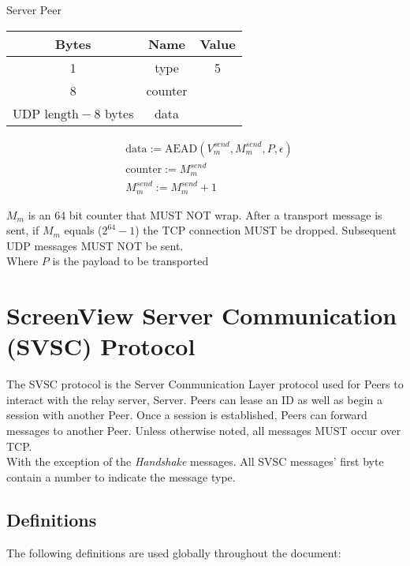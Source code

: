 \documentclass{article}
\begin{document}
    \begin{center}
        Server \textrightarrow Peer\\
        \begin{tabular}{|c|c|c|}
            \hline
            \textbf{Bytes}                & \textbf{Name} & \textbf{Value} \\
            \hline
            1                             & type          & 5              \\
            \hline
            8                             & counter       &                \\
            \hline
            $\text{UDP length} - 8$ bytes & data          &                \\
            \hline
        \end{tabular}
    \end{center}


    \begin{align*}
        & \text{data} := \text{AEAD}(V_{m}^{send}, M_{m}^{send}, P, \epsilon)\\
        & \text{counter} := M_{m}^{send}\\
        & M_{m}^{send} := M_{m}^{send} + 1
    \end{align*}


    $M_{m}$ is an 64 bit counter that MUST NOT wrap. After a transport message is sent, if $M_{m}$ equals
    ($2^{64}-1$) the TCP connection MUST be dropped. Subsequent UDP messages MUST NOT be sent. \\

    Where $P$ is the payload to be transported


    \section{ScreenView Server Communication (SVSC) Protocol }

    The SVSC protocol is the Server Communication Layer protocol used for Peers to interact with the relay server,
    Server. Peers can lease an ID as well as begin a session with another Peer. Once a session is established, Peers can
    forward messages to another Peer. Unless otherwise noted, all messages MUST occur over TCP.\\

    With the exception of the \emph{Handshake} messages. All SVSC messages' first byte contain a number to indicate
    the message type.

    \subsection{Definitions}
    The following definitions are used globally throughout the document:
\end{document}
